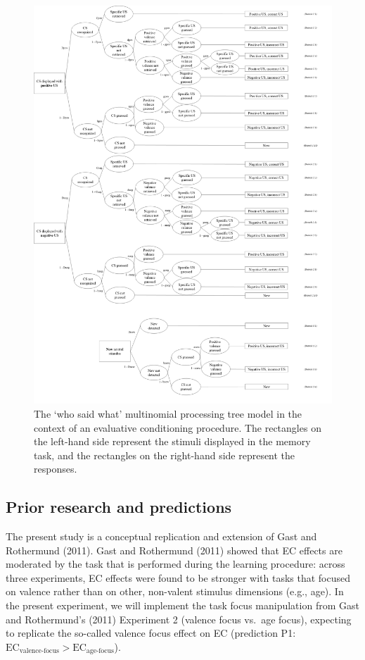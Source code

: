 \documentclass[
  doc,floatsintext]{apa6}
\begin{document}
\begin{figure}
\includegraphics[width=7.56in]{mpt_wsw_model_exp3_KB2} \caption{The `who said what' multinomial processing tree model in the context of an evaluative conditioning procedure. The rectangles on the left-hand side represent the stimuli displayed in the memory task, and the rectangles on the right-hand side represent the responses.}\label{fig:cspos-tree}
\end{figure}

\hypertarget{prior-research-and-predictions}{%
\subsection{Prior research and predictions}\label{prior-research-and-predictions}}

The present study is a conceptual replication and extension of Gast and Rothermund (2011).
Gast and Rothermund (2011) showed that EC effects are moderated by the task that is performed during the learning procedure: across three experiments, EC effects were found to be stronger with tasks that focused on valence rather than on other, non-valent stimulus dimensions (e.g., age).
In the present experiment, we will implement the task focus manipulation from Gast and Rothermund's (2011) Experiment 2 (valence focus vs.~age focus), expecting to replicate the so-called valence focus effect on EC (prediction P1: \(\textrm{EC}_\textrm{valence-focus}>\textrm{EC}_\textrm{age-focus}\)).
\end{document}
